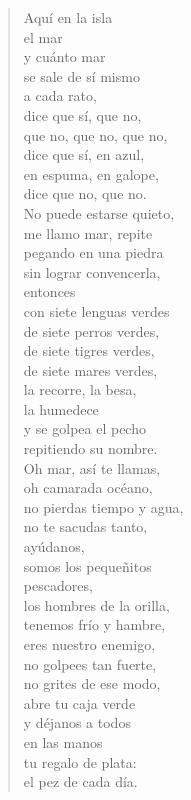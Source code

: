 \documentclass[12pt]{article}
\begin{document}
\clearpage
{}
\begin{verse}

Aquí en la isla\\
el mar\\
y cuánto mar\\
se sale de sí mismo\\
a cada rato,\\
dice que sí, que no,\\
que no, que no, que no,\\
dice que sí, en azul,\\
en espuma, en galope,\\
dice que no, que no.\\
No puede estarse quieto,\\
me llamo mar, repite\\
pegando en una piedra\\
sin lograr convencerla,\\
entonces\\
con siete lenguas verdes\\
de siete perros verdes,\\
de siete tigres verdes,\\
de siete mares verdes,\\
la recorre, la besa,\\
la humedece\\
y se golpea el pecho\\
repitiendo su nombre.\\
Oh mar, así te llamas,\\
oh camarada océano,\\
no pierdas tiempo y agua,\\
no te sacudas tanto,\\
ayúdanos,\\
somos los pequeñitos\\
pescadores,\\
los hombres de la orilla,\\
tenemos frío y hambre,\\
eres nuestro enemigo,\\
no golpees tan fuerte,\\
no grites de ese modo,\\
abre tu caja verde\\
y déjanos a todos\\
en las manos\\
tu regalo de plata:\\
el pez de cada día.  


\end{verse}
\end{document}
